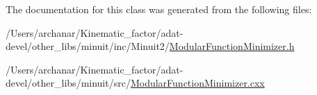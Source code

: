 The documentation for this class was generated from the following files\+:\begin{DoxyCompactItemize}
\item 
/\+Users/archanar/\+Kinematic\+\_\+factor/adat-\/devel/other\+\_\+libs/minuit/inc/\+Minuit2/\mbox{\hyperlink{adat-devel_2other__libs_2minuit_2inc_2Minuit2_2ModularFunctionMinimizer_8h}{Modular\+Function\+Minimizer.\+h}}\item 
/\+Users/archanar/\+Kinematic\+\_\+factor/adat-\/devel/other\+\_\+libs/minuit/src/\mbox{\hyperlink{adat-devel_2other__libs_2minuit_2src_2ModularFunctionMinimizer_8cxx}{Modular\+Function\+Minimizer.\+cxx}}\end{DoxyCompactItemize}
